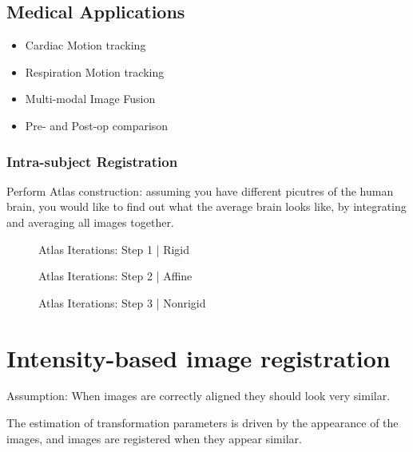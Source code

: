 \documentclass[11pt]{article}
\begin{document}
\subsection{Medical Applications}

\begin{itemize}
    \item Cardiac Motion tracking
    \item Respiration Motion tracking
    \item Multi-modal Image Fusion
    \item Pre- and Post-op comparison
\end{itemize}

\subsubsection{Intra-subject Registration}

Perform Atlas construction: assuming you have different picutres of the human brain, you would like to find out what the average brain looks like, by integrating and averaging all images together. 

\begin{figure}[H]
    \centering
    \caption*{Atlas Iterations: Step 1 | Rigid}
\end{figure}

\begin{figure}[H]
    \centering
    \caption*{Atlas Iterations: Step 2 | Affine}
\end{figure}

\begin{figure}[H]
    \centering
    \caption*{Atlas Iterations: Step 3 | Nonrigid}
\end{figure}

\section{Intensity-based image registration}

Assumption: When images are correctly aligned they should look very similar.

The estimation of transformation parameters is driven by the appearance of the images, and images are registered when they appear similar.
\end{document}
